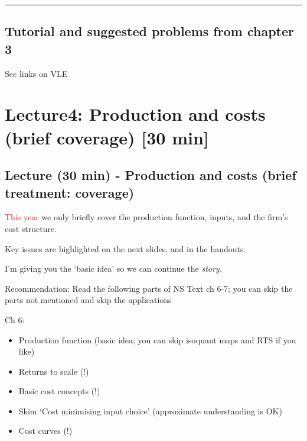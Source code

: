 \documentclass[]{article}
\begin{document}
\begin{center}\rule{0.5\linewidth}{\linethickness}\end{center}

\hypertarget{tutorial-and-suggested-problems-from-chapter-3}{%
\subsection{Tutorial and suggested problems from chapter
3}\label{tutorial-and-suggested-problems-from-chapter-3}}

See links on VLE

\hypertarget{lecture4-production-and-costs-brief-coverage-30-min}{%
\section{Lecture4: Production and costs (brief coverage) {[}30
min{]}}\label{lecture4-production-and-costs-brief-coverage-30-min}}

\hypertarget{lecture-30-min---production-and-costs-brief-treatment-coverage}{%
\subsection{Lecture (30 min) - Production and costs (brief treatment:
coverage)}\label{lecture-30-min---production-and-costs-brief-treatment-coverage}}

\textcolor{red}{This year} we only briefly cover the production
function, inputs, and the firm's cost structure.

\bigskip

Key issues are highlighted on the next slides, and in the handouts.

I'm giving you the `basic idea' so we can continue the \emph{story.}

\bigskip

Recommendation: Read the following parts of NS Text ch 6-7; you can skip
the parts not mentioned and skip the applications

Ch 6:

\begin{itemize}
\item
  Production function (basic idea; you can skip isoquant maps and RTS if
  you like)
\item
  Returns to scale (!)
\item
  Basic cost concepts (!)
\item
  Skim `Cost minimising input choice' (approximate understanding is OK)
\item
  Cost curves (!)
\end{itemize}
\end{document}
